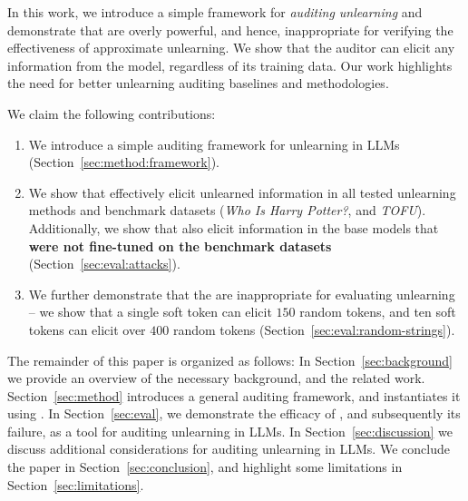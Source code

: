In this work, we introduce a simple framework for \emph{auditing unlearning} and demonstrate that  are overly powerful, and hence, inappropriate for verifying the effectiveness of approximate unlearning.
We show that the auditor can elicit any information from the model, regardless of its training data. 
Our work highlights the need for better unlearning auditing baselines and methodologies.

We claim the following contributions:
\begin{enumerate}[label=\arabic*.]
    \item We introduce a simple auditing framework for unlearning in LLMs (Section~\ref{sec:method:framework}).
    \item We show that  effectively elicit unlearned information in all tested unlearning methods and benchmark datasets (\emph{Who Is Harry Potter?}, and \emph{TOFU}). Additionally, we show that  also elicit information in the base models that \textbf{were not fine-tuned on the benchmark datasets} (Section~\ref{sec:eval:attacks}).
    \item We further demonstrate that the  are inappropriate for evaluating unlearning -- we show that a single soft token can elicit $150$ random tokens, and ten soft tokens can elicit over $400$ random tokens (Section~\ref{sec:eval:random-strings}).
\end{enumerate}

The remainder of this paper is organized as follows:
In Section~\ref{sec:background} we provide an overview of the necessary background, and the related work.
Section~\ref{sec:method} introduces a general auditing framework, and instantiates it using \sta.
In Section~\ref{sec:eval}, we demonstrate the efficacy of \sta, and subsequently its failure, as a tool for auditing unlearning in LLMs. 
In Section~\ref{sec:discussion} we discuss additional considerations for auditing unlearning in LLMs.
We conclude the paper in Section~\ref{sec:conclusion}, and highlight some limitations in Section~\ref{sec:limitations}.


